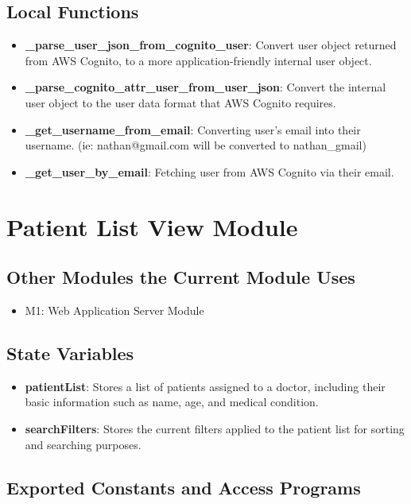 \documentclass[12pt, titlepage]{article}
\begin{document}
\subsection{Local Functions}
\begin{itemize}
    \item \textbf{\_parse\_user\_json\_from\_cognito\_user}: Convert user object returned from AWS Cognito, to a more application-friendly internal user object.
    \item \textbf{\_parse\_cognito\_attr\_user\_from\_user\_json}: Convert the internal user object to the user data format that AWS Cognito requires.
    \item \textbf{\_get\_username\_from\_email}: Converting user's email into their username. (ie: nathan@gmail.com will be converted to nathan\_gmail)
    \item \textbf{\_get\_user\_by\_email}: Fetching user from AWS Cognito via their email. 
\end{itemize}

\section{Patient List View Module}

\subsection{Other Modules the Current Module Uses}
\begin{itemize}
    \item M1: Web Application Server Module
\end{itemize}

\subsection{State Variables}
\begin{itemize}
\item \textbf{patientList}: Stores a list of patients assigned to a doctor, including their basic information such as name, age, and medical condition.
\item \textbf{searchFilters}: Stores the current filters applied to the patient list for sorting and searching purposes.
\end{itemize}

\subsection{Exported Constants and Access Programs}
\end{document}
